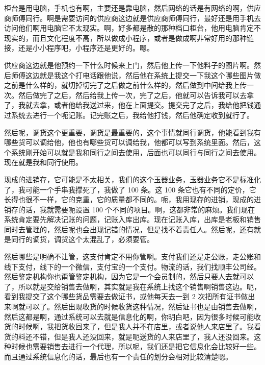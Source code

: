 \documentclass[12pt, a4paper]{ctexart}
\begin{document}
\medskip
\noindent
柜台是用电脑，手机也有啊，主要还是靠电脑，然后网络的话是有网络的啊，供应商师傅同行。啊是需要访问的供应商这边就是供应商师傅同行，最好还是用手机去访问他们啊用电脑它不太现实。啊，好多都是散的那种档口柜台，他用电脑肯定不现实的，而且文化程度不高，所以做成小程序，或者是做成啊非常好用的那种链接，还是小小程序吧，小程序还是更好的。嗯。

\medskip
\noindent
供应商这边就是他预约一下什么时候来上门，然后他上传一下他料子的图片啊。然后师傅这边就是我这个打电话跟他说，然后他在系统上提交一下我这个哪些图片做之前是什么样的，就切掉切完了之后做之前什么样的，然后做到中间给我上传一次。然后做完了之后，然后给我上传一次，完了之后，他就可以告诉我可以去拿了，我就去拿，或者他给我送过来，他在上面提交。提交完了之后，我给他把钱通过系统去进行一个呃记账。记完账之后，我给他打钱，然后他确定收到就行了。

\medskip
\noindent
然后呢，调货这个更重要，调货是最重要的，这个事情就同行调货，他能看到我有哪些货可以调给他，他也有哪些货可以调给我，他都可以写到系统里面。然后，这个系统刚开始可以就是我和同行之间去使用，后面也可以同行与同行之间去使用。现在就是我和同行使用。

\medskip
\noindent
现成的进销存，它可能是不太相关，我们的这个玉器业务，玉器业务它不是标准化了，我可能一个手串我撑死了，我做了 100 条。这 100 条它也有不同的定价，它长得也很不一样，它的克重，它的质量都不同的。呃，我用现存的进销，现成的进销存的话，我就需要呃设置 100 个不同的项目。啊，这都非常的麻烦。我们现在系统肯定要先解决记账的问题，记账入库出库。现在记账入库，出库是老板和销售同时去管理的，然后呢也会出现记错的情况，但是找不着责任人。然后呢，还有就是同行的调货，调货这个太混乱了，必须要管。

\medskip
\noindent
然后哪些是明确不让管，这支付肯定不用你管啊。支付我们还是走公账，走公账和线下支付，线下的一个微信，支付宝的一个支付。物流的话，我们找顺丰公司经。然后鉴定机构你也甭管鉴定机构，因为它是一个会员制的，然后只要人去就可以了，所以就是交给销售去做啊，其实就是我在系统上找这个销售啊销售这边。呃，看到我提交了这个哪些货品需要去做证书，或他每天去一到 2 次把所有证书做出来啊就可以了。然后出现收货的时候收货这种情况，然后证书也是由销售去做啊，然后这都是啊，通过系统可以去就是信息化的啊，你明白吧，因为很多时候可能收货的时候啊，我把货收回来了，但是我人并不在店里，或者说他人来店里了。我看货的料还不错，但是我人还没回来，就是呃送货的人来店里了，我人还没回来。这种时候也需要销售去进行一个代理，所以呢，我们还是把它信息化会比较好一些。而且通过系统信息化的话，最后也有一个责任的划分会相对比较清楚嗯。
\end{document}
